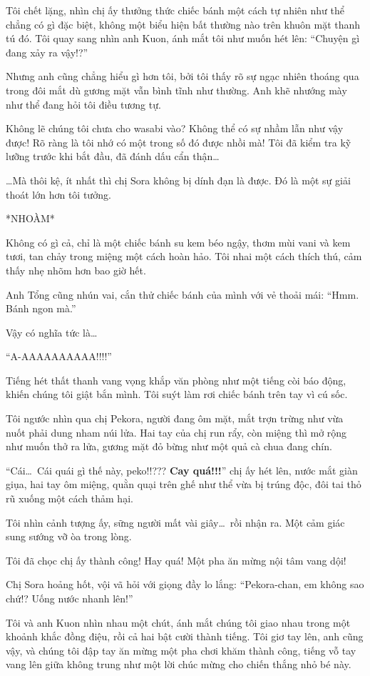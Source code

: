 \documentclass[../main.tex]{subfiles}
\begin{document}
Tôi chết lặng, nhìn chị ấy thưởng thức chiếc bánh một cách tự nhiên như thể chẳng có gì đặc biệt, không một biểu hiện bất thường nào trên khuôn mặt thanh tú đó. Tôi quay sang nhìn anh Kuon, ánh mắt tôi như muốn hét lên: ``Chuyện gì đang xảy ra vậy!?''

Nhưng anh cũng chẳng hiểu gì hơn tôi, bởi tôi thấy rõ sự ngạc nhiên thoáng qua trong đôi mắt dù gương mặt vẫn bình tĩnh như thường. Anh khẽ nhướng mày như thể đang hỏi tôi điều tương tự.

Không lẽ chúng tôi chưa cho wasabi vào? Không thể có sự nhầm lẫn như vậy được! Rõ ràng là tôi nhớ có một trong số đó được nhồi mà! Tôi đã kiểm tra kỹ lưỡng trước khi bắt đầu, đã đánh dấu cẩn thận\dots

\dots Mà thôi kệ, ít nhất thì chị Sora không bị dính đạn là được. Đó là một sự giải thoát lớn hơn tôi tưởng.

*NHOÀM*

Không có gì cả, chỉ là một chiếc bánh su kem béo ngậy, thơm mùi vani và kem tươi, tan chảy trong miệng một cách hoàn hảo. Tôi nhai một cách thích thú, cảm thấy nhẹ nhõm hơn bao giờ hết.

Anh Tổng cũng nhún vai, cắn thử chiếc bánh của mình với vẻ thoải mái: ``Hmm. Bánh ngon mà.''

Vậy có nghĩa tức là\dots

``A-AAAAAAAAAA!!!!''

Tiếng hét thất thanh vang vọng khắp văn phòng như một tiếng còi báo động, khiến chúng tôi giật bắn mình. Tôi suýt làm rơi chiếc bánh trên tay vì cú sốc.

Tôi ngước nhìn qua chị Pekora, người đang ôm mặt, mắt trợn trừng như vừa nuốt phải dung nham núi lửa. Hai tay của chị run rẩy, còn miệng thì mở rộng như muốn thở ra lửa, gương mặt đỏ bừng như một quả cà chua đang chín.

``Cái\dots\ Cái quái gì thế này, peko!!??? \textbf{Cay quá!!!}'' chị ấy hét lên, nước mắt giàn giụa, hai tay ôm miệng, quằn quại trên ghế như thể vừa bị trúng độc, đôi tai thỏ rũ xuống một cách thảm hại.

Tôi nhìn cảnh tượng ấy, sững người mất vài giây\dots\ rồi nhận ra. Một cảm giác sung sướng vỡ òa trong lòng.

Tôi đã chọc chị ấy thành công! Hay quá! Một pha ăn mừng nội tâm vang dội!

Chị Sora hoảng hốt, vội vã hỏi với giọng đầy lo lắng: ``Pekora-chan, em không sao chứ!? Uống nước nhanh lên!''

Tôi và anh Kuon nhìn nhau một chút, ánh mắt chúng tôi giao nhau trong một khoảnh khắc đồng điệu, rồi cả hai bật cười thành tiếng. Tôi giơ tay lên, anh cũng vậy, và chúng tôi đập tay ăn mừng một pha chơi khăm thành công, tiếng vỗ tay vang lên giữa không trung như một lời chúc mừng cho chiến thắng nhỏ bé này.
\end{document}
